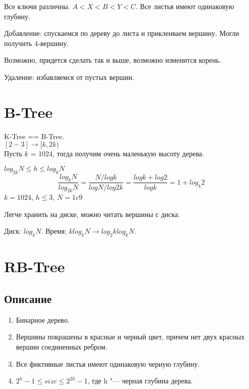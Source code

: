 
Все ключи различны. $A < X < B < Y < C$. Все листья имеют одинаковую глубину.

Добавление: спускаемся по дереву до листа и приклеиваем вершину. Могли получить 4-вершину.


Возможно, придется сделать так и выше, возможно изменится корень.

Удаление: избавляемся от пустых вершин.



\section{B-Tree}

K-Tree == B-Tree.\\

$[2-3] \longrightarrow [k, 2k)$\\

Пусть $k$ = 1024, тогда получим очень маленькую высоту дерева.

$log_{2k}{N} \leqslant h \leqslant log_{k}{N}$
\[ \frac{log_{k}{N}}{log_{2k}{N}} = \frac{N/log{k}}{log{N}/log{2k}} = \frac{log{k} + log{2}}{log{k}} = 1 + log_{k}{2} \]
$k = 1024$, $h \leqslant 3$, $N = 1e9$

Легче хранить на диске, можно читать вершины с диска.

Диск: $log_{k}{N}$. Время: $klog_{k}{N} \longrightarrow log_{2}{k} log_{k}{N}$.

\section{RB-Tree}

\subsection{Описание}
\begin{enumerate}
	\item Бинарное дерево.
	\item Вершины покрашены в красные и черный цвет, причем нет двух красных вершин соединенных ребром.
	\item Все фиктивные листья имеют одинаковую черную глубину.
	\item $2^{h} - 1 \leqslant size \leqslant 2^{2h} - 1$, где h "--- черная глубина дерева.
\end{enumerate}

